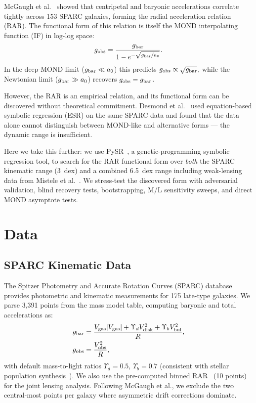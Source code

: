 \documentclass[twocolumn]{aastex631}
\begin{document}
McGaugh et al.~\cite{mcgaugh2016} showed that centripetal and baryonic
accelerations correlate tightly across 153 SPARC galaxies, forming the radial
acceleration relation (RAR).  The functional form of this relation is itself
the MOND interpolating function (IF) in log-log space:
\[
g_{\rm obs} = \frac{g_{\rm bar}}{1 - e^{-\sqrt{g_{\rm bar}/a_0}}}.
\]
In the deep-MOND limit ($g_{\rm bar} \ll a_0$) this predicts $g_{\rm obs}
\propto \sqrt{g_{\rm bar}}$, while the Newtonian limit ($g_{\rm bar} \gg a_0$)
recovers $g_{\rm obs} = g_{\rm bar}$.

However, the RAR is an empirical relation, and its functional form can be
discovered without theoretical commitment.  Desmond et al.~\cite{desmond2023}
used equation-based symbolic regression (ESR) on the same SPARC data and
found that the data alone cannot distinguish between MOND-like and
alternative forms --- the dynamic range is insufficient.

Here we take this further: we use PySR~\cite{pysr}, a genetic-programming
symbolic regression tool, to search for the RAR functional form over
\emph{both} the SPARC kinematic range (3~dex) and a combined 6.5~dex range
including weak-lensing data from Mistele et al.~\cite{mistele2024}.  We
stress-test the discovered form with adversarial validation, blind recovery
tests, bootstrapping, M/L sensitivity sweeps, and direct MOND asymptote
tests.

\section{Data}

\subsection{SPARC Kinematic Data}

The Spitzer Photometry and Accurate Rotation Curves (SPARC) database~\cite{lelli2016}
provides photometric and kinematic measurements for 175 late-type galaxies.
We parse 3,391 points from the mass model table, computing baryonic and
total accelerations as:
\begin{align}
g_{\rm bar} &= \frac{V_{\rm gas}|V_{\rm gas}|
+ \Upsilon_d V_{\rm disk}^2 + \Upsilon_b V_{\rm bul}^2}{R},\\
g_{\rm obs} &= \frac{V_{\rm obs}^2}{R},
\end{align}
with default mass-to-light ratios $\Upsilon_d = 0.5$, $\Upsilon_b = 0.7$
(consistent with stellar population synthesis~\cite{mcgaugh2016,schombert2019}).
We also use the pre-computed binned RAR~\cite{lelli2017} (10 points) for
the joint lensing analysis.  Following McGaugh et al., we exclude the two
central-most points per galaxy where asymmetric drift corrections dominate.
\end{document}
